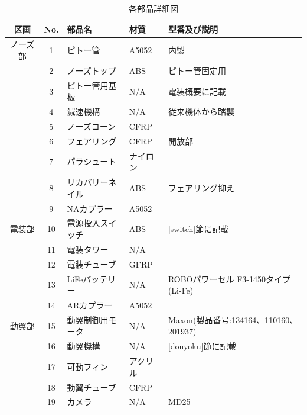 \documentclass[a4paper,11pt,uplatex]{jsarticle}
\begin{document}
\renewcommand{\arraystretch}{0.9}
\begin{longtable}[H]{cclll}
	\caption{各部品詳細図}
	\label{s_buhin}                                                    \\
	\toprule
	区画    & No. & 部品名       & 材質    & 型番及び説明                           \\ \hline \endhead
	ノーズ部  & 1   & ピトー管      & A5052 & 内製                               \\
	      & 2   & ノーズトップ    & ABS   & ピトー管固定用                          \\
	      & 3   & ピトー管用基板   & N/A   & 電装概要に記載                          \\
	      & 4   & 減速機構      & N/A   & 従来機体から踏襲                         \\
	      & 5   & ノーズコーン    & CFRP  &                                  \\
	      & 6   & フェアリング    & CFRP  & 開放部                              \\
	      & 7   & パラシュート    & ナイロン  &                                  \\
	      & 8   & リカバリーネイル  & ABS   & フェアリング抑え                         \\\midrule
	      & 9   & NAカプラー    & A5052 &                                  \\ \midrule
	電装部   & 10  & 電源投入スイッチ  & ABS   & \ref{switch}節に記載                 \\
	      & 11  & 電装タワー     & N/A   &                                  \\
	      & 12  & 電装チューブ    & GFRP  &                                  \\
	      & 13  & LiFeバッテリー & N/A   & ROBOパワーセル F3-1450タイプ(Li-Fe)      \\ \midrule
	      & 14  & ARカプラー    & A5052 &                                  \\ \midrule
	動翼部   & 15  & 動翼制御用モータ  & N/A   & Maxon(製品番号:134164、110160、201937) \\
	      & 16  & 動翼機構      & N/A   & \ref{douyoku}節に記載                \\
	      & 17  & 可動フィン     & アクリル  &                                  \\
	      & 18  & 動翼チューブ    & CFRP                                     \\
	      & 19  & カメラ       & N/A   & MD25                             \\

\end{longtable}
\end{document}
